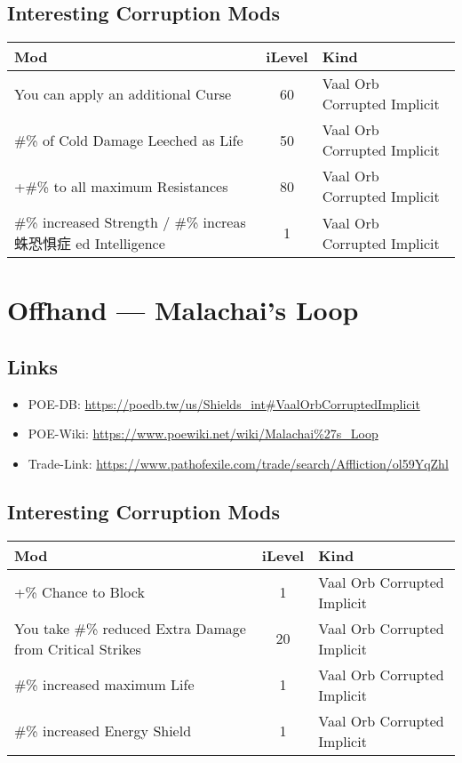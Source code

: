 \subsection{Interesting Corruption Mods}
\begin{tabular}{|l|c|l|}
	\hline
	Mod&iLevel&Kind\\\hline
	You can apply an additional Curse &60& Vaal Orb Corrupted Implicit \\\hline
	\#\% of Cold Damage Leeched as Life&50& Vaal Orb Corrupted Implicit \\\hline
	+\#\% to all maximum Resistances&80& Vaal Orb Corrupted Implicit \\\hline
	\#\% increased Strength / \#\% increas蛛恐惧症
	ed Intelligence&1& Vaal Orb Corrupted Implicit \\\hline
\end{tabular}

\section{Offhand --- Malachai's Loop}
\subsection{Links}
\begin{itemize}
	\item POE-DB: \url{https://poedb.tw/us/Shields_int#VaalOrbCorruptedImplicit}
	\item POE-Wiki: \url{https://www.poewiki.net/wiki/Malachai%27s_Loop}
	\item Trade-Link: \url{https://www.pathofexile.com/trade/search/Affliction/ol59YqZhl}
\end{itemize}

\subsection{Interesting Corruption Mods}
\begin{tabular}{|l|c|l|}
	\hline
	Mod&iLevel&Kind\\\hline
	+\% Chance to Block &1& Vaal Orb Corrupted Implicit \\\hline
	You take \#\% reduced Extra Damage from Critical Strikes&20& Vaal Orb Corrupted Implicit \\\hline
	\#\% increased maximum Life&1& Vaal Orb Corrupted Implicit \\\hline
	\#\% increased Energy Shield&1& Vaal Orb Corrupted Implicit \\\hline
\end{tabular}

